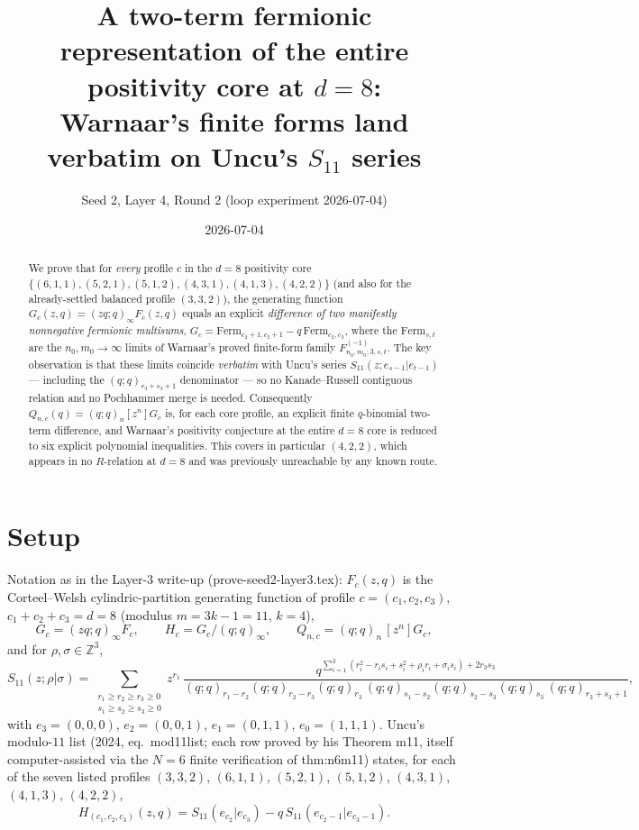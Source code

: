 \documentclass[11pt]{article}
\title{A two-term fermionic representation of the entire positivity core at $d=8$:\\
Warnaar's finite forms land verbatim on Uncu's $S_{11}$ series}
\author{Seed 2, Layer 4, Round 2 (loop experiment 2026-07-04)}
\date{2026-07-04}
\newcommand{\poch}[1]{(q;q)_{#1}}
\newcommand{\Ferm}{\mathrm{Ferm}}
\begin{document}
\maketitle

\begin{abstract}
We prove that for \emph{every} profile $c$ in the $d=8$ positivity core
$\{(6,1,1),(5,2,1),(5,1,2),(4,3,1),(4,1,3),(4,2,2)\}$ (and also for the
already-settled balanced profile $(3,3,2)$), the generating function
$G_c(z,q)=(zq;q)_\infty F_c(z,q)$ equals an explicit \emph{difference of two
manifestly nonnegative fermionic multisums},
$G_c=\Ferm_{c_2+1,c_3+1}-q\,\Ferm_{c_2,c_3}$, where the $\Ferm_{s,t}$ are the
$n_0,m_0\to\infty$ limits of Warnaar's proved finite-form family
$F^{(-1)}_{n_0,m_0;3,s,t}$. The key observation is that these limits coincide
\emph{verbatim} with Uncu's series $S_{11}(z;e_{s-1}|e_{t-1})$ --- including
the $\poch{r_3+s_3+1}$ denominator --- so no Kanade--Russell contiguous
relation and no Pochhammer merge is needed. Consequently
$Q_{n,c}(q)=\poch{n}[z^n]G_c$ is, for each core profile, an explicit finite
$q$-binomial two-term difference, and Warnaar's positivity conjecture at the
entire $d=8$ core is reduced to six explicit polynomial inequalities. This
covers in particular $(4,2,2)$, which appears in no $R$-relation at $d=8$ and
was previously unreachable by any known route.
\end{abstract}

\section{Setup}

Notation as in the Layer-3 write-up (prove-seed2-layer3.tex): $F_c(z,q)$ is
the Corteel--Welsh cylindric-partition generating function of profile
$c=(c_1,c_2,c_3)$, $c_1+c_2+c_3=d=8$ (modulus $m=3k-1=11$, $k=4$),
\[
G_c=(zq;q)_\infty F_c,\qquad H_c=G_c/(q;q)_\infty,\qquad
Q_{n,c}=\poch{n}\,[z^n]G_c,
\]
and for $\rho,\sigma\in\mathbb{Z}^3$,
\begin{equation}\label{eq:S11}
S_{11}(z;\rho|\sigma)=
\sum_{\substack{r_1\ge r_2\ge r_3\ge 0\\ s_1\ge s_2\ge s_3\ge 0}}
z^{r_1}\,
\frac{q^{\sum_{i=1}^{3}(r_i^2-r_is_i+s_i^2+\rho_ir_i+\sigma_is_i)+2r_3s_3}}
{\poch{r_1-r_2}\poch{r_2-r_3}\poch{r_3}\,
 \poch{s_1-s_2}\poch{s_2-s_3}\poch{s_3}\,\poch{r_3+s_3+1}},
\end{equation}
with $e_3=(0,0,0)$, $e_2=(0,0,1)$, $e_1=(0,1,1)$, $e_0=(1,1,1)$.
Uncu's modulo-$11$ list (2024, eq.\ mod11list; each row proved by his
Theorem m11, itself computer-assisted via the $N=6$ finite verification of
thm:n6m11) states, for each of the seven listed profiles
$(3,3,2)$, $(6,1,1)$, $(5,2,1)$, $(5,1,2)$, $(4,3,1)$, $(4,1,3)$, $(4,2,2)$,
\begin{equation}\label{eq:uncu}
H_{(c_1,c_2,c_3)}(z,q)=S_{11}(e_{c_2}|e_{c_3})-q\,S_{11}(e_{c_2-1}|e_{c_3-1}).
\end{equation}
\end{document}
